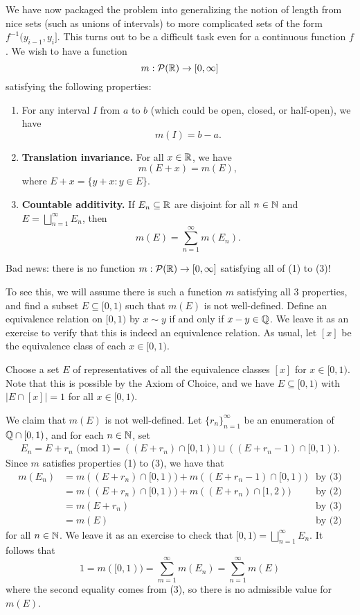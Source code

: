 We have now packaged the problem into generalizing the notion of length 
from nice sets (such as unions of intervals) to more complicated sets 
of the form $f^{-1}(y_{i-1}, y_i]$. This turns out to be a difficult task 
even for a continuous function $f$. We wish to have a function 
\[ m : {\cal P}(\mathbb{R}) \to [0, \infty] \] 
satisfying the following properties: 
\begin{enumerate}[(1)]
    \item For any interval $I$ from $a$ to $b$ (which could be open, closed, 
    or half-open), we have 
    \[ m(I) = b-a. \] 
    \item {\bf Translation invariance.} For all $x \in \mathbb{R}$, we have 
    \[ m(E + x) = m(E), \] 
    where $E + x = \{y + x : y \in E\}$. 
    \item {\bf Countable additivity.} If $E_n \subseteq \mathbb{R}$ are disjoint 
    for all $n \in \mathbb{N}$ and $E = \bigsqcup_{n=1}^\infty E_n$, then 
    \[ m(E) = \sum_{n=1}^\infty m(E_n). \] 
\end{enumerate}
Bad news: there is no function $m : {\cal P}(\mathbb{R}) \to [0, \infty]$ 
satisfying all of (1) to (3)! 

To see this, we will assume there is such a function $m$ satisfying all $3$ 
properties, and find a subset $E \subseteq [0, 1)$ such that $m(E)$ is not 
well-defined. Define an equivalence relation on $[0, 1)$ by $x \sim y$ 
if and only if $x - y \in \mathbb{Q}$. We leave it as an exercise to verify that 
this is indeed an equivalence relation. As usual, let $[x]$ be the 
equivalence class of each $x \in [0, 1)$. 

Choose a set $E$ of representatives of all the equivalence classes $[x]$ for 
$x \in [0, 1)$. Note that this is possible by the Axiom of Choice, and we have 
$E \subseteq [0, 1)$ with $|E \cap [x]| = 1$ for all $x \in [0, 1)$. 

We claim that $m(E)$ is not well-defined. Let $\{r_n\}_{n=1}^\infty$ be 
an enumeration of $\mathbb{Q} \cap [0, 1)$, and for each $n \in \mathbb{N}$, set 
\begin{align*}
    E_n = E + r_n \text{ (mod $1$)} = ((E + r_n) \cap [0, 1)) \sqcup 
    ((E + r_n - 1) \cap [0, 1)). 
\end{align*}
Since $m$ satisfies properties (1) to (3), we have that 
\begin{align*}
    m(E_n) &= m((E + r_n) \cap [0, 1)) + m((E + r_n - 1) \cap [0, 1)) & 
    \text{by (3)} \\ 
    &= m((E + r_n) \cap [0, 1)) + m((E + r_n) \cap [1, 2)) & \text{by (2)} \\ 
    &= m(E + r_n) & \text{by (3)} \\ 
    &= m(E) & \text{by (2)}
\end{align*}
for all $n \in \mathbb{N}$. We leave it as an exercise to check that $[0, 1) = 
\bigsqcup_{n=1}^\infty E_n$. It follows that 
\[ 1 = m([0, 1)) = \sum_{m=1}^\infty m(E_n) = \sum_{n=1}^\infty m(E) \] 
where the second equality comes from (3), so there is no admissible value for 
$m(E)$. 

